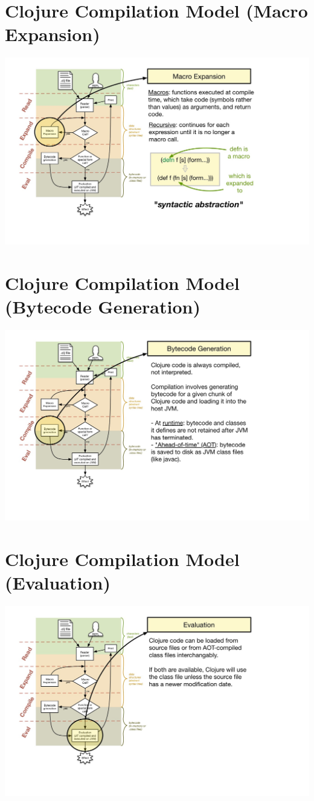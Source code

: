 \documentclass[11pt]{article}
\begin{document}
\section{Clojure Compilation Model (Macro Expansion)}
\label{sec:orgheadline13}
\hspace*{-4cm}\includegraphics[width=1.9\linewidth]{IMG_0111.JPG}

\section{Clojure Compilation Model (Bytecode Generation)}
\label{sec:orgheadline14}
\hspace*{-4cm}\includegraphics[width=1.9\linewidth]{IMG_0112.JPG}

\section{Clojure Compilation Model (Evaluation)}
\label{sec:orgheadline15}
\hspace*{-4cm}\includegraphics[width=1.9\linewidth]{IMG_0113.JPG}
\end{document}
